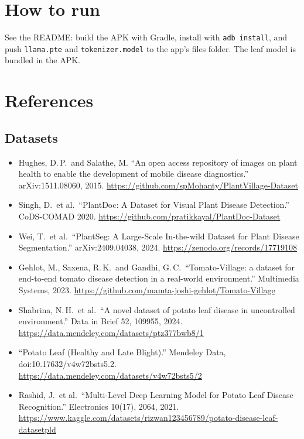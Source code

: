 \documentclass[11pt,a4paper]{article}
\begin{document}
\section{How to run}

See the README: build the APK with Gradle, install with \texttt{adb install}, and
push \texttt{llama.pte} and \texttt{tokenizer.model} to the app's files folder.
The leaf model is bundled in the APK.

\section{References}

\subsection*{Datasets}

\begin{itemize}[label={},leftmargin=2.4em,labelsep=0.45em,itemsep=0.3em]
  \item[{[1]}] Hughes, D.\,P.\ and Salathe, M. ``An open access repository of images on plant health to enable the development of mobile disease diagnostics.'' arXiv:1511.08060, 2015. \url{https://github.com/spMohanty/PlantVillage-Dataset}
  \item[{[2]}] Singh, D.\ et al.\ ``PlantDoc: A Dataset for Visual Plant Disease Detection.'' CoDS-COMAD 2020. \url{https://github.com/pratikkayal/PlantDoc-Dataset}
  \item[{[3]}] Wei, T.\ et al.\ ``PlantSeg: A Large-Scale In-the-wild Dataset for Plant Disease Segmentation.'' arXiv:2409.04038, 2024. \url{https://zenodo.org/records/17719108}
  \item[{[4]}] Gehlot, M., Saxena, R.\,K.\ and Gandhi, G.\,C.\ ``Tomato-Village: a dataset for end-to-end tomato disease detection in a real-world environment.'' Multimedia Systems, 2023. \url{https://github.com/mamta-joshi-gehlot/Tomato-Village}
  \item[{[5]}] Shabrina, N.\,H.\ et al.\ ``A novel dataset of potato leaf disease in uncontrolled environment.'' Data in Brief 52, 109955, 2024. \url{https://data.mendeley.com/datasets/ptz377bwb8/1}
  \item[{[6]}] ``Potato Leaf (Healthy and Late Blight).'' Mendeley Data, doi:10.17632/v4w72bsts5.2. \url{https://data.mendeley.com/datasets/v4w72bsts5/2}
  \item[{[7]}] Rashid, J.\ et al.\ ``Multi-Level Deep Learning Model for Potato Leaf Disease Recognition.'' Electronics 10(17), 2064, 2021. \url{https://www.kaggle.com/datasets/rizwan123456789/potato-disease-leaf-datasetpld}
\end{itemize}
\end{document}
